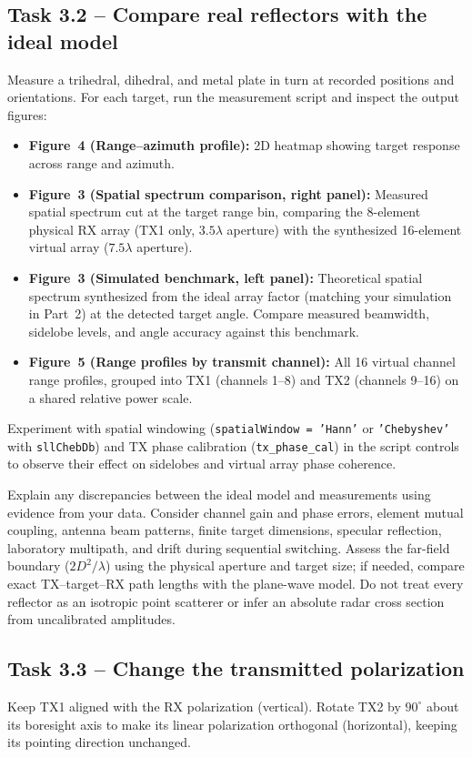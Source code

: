 \documentclass[11pt,a4paper]{article}
\newcommand{\task}[2]{\subsection*{Task #1 -- #2}}
\begin{document}
\task{3.2}{Compare real reflectors with the ideal model}
Measure a trihedral, dihedral, and metal plate in turn at recorded positions and orientations. For each target, run the measurement script and inspect the output figures:
\begin{itemize}
\item \textbf{Figure~4 (Range--azimuth profile):} 2D heatmap showing target response across range and azimuth.
\item \textbf{Figure~3 (Spatial spectrum comparison, right panel):} Measured spatial spectrum cut at the target range bin, comparing the 8-element physical RX array (TX1 only, $3.5\lambda$ aperture) with the synthesized 16-element virtual array ($7.5\lambda$ aperture).
\item \textbf{Figure~3 (Simulated benchmark, left panel):} Theoretical spatial spectrum synthesized from the ideal array factor (matching your simulation in Part~2) at the detected target angle. Compare measured beamwidth, sidelobe levels, and angle accuracy against this benchmark.
\item \textbf{Figure~5 (Range profiles by transmit channel):} All 16 virtual channel range profiles, grouped into TX1 (channels 1--8) and TX2 (channels 9--16) on a shared relative power scale.
\end{itemize}

Experiment with spatial windowing (\texttt{spatialWindow = 'Hann'} or \texttt{'Chebyshev'} with \texttt{sllChebDb}) and TX phase calibration (\texttt{tx\_phase\_cal}) in the script controls to observe their effect on sidelobes and virtual array phase coherence.

Explain any discrepancies between the ideal model and measurements using evidence from your data. Consider channel gain and phase errors, element mutual coupling, antenna beam patterns, finite target dimensions, specular reflection, laboratory multipath, and drift during sequential switching. Assess the far-field boundary ($2D^2/\lambda$) using the physical aperture and target size; if needed, compare exact TX--target--RX path lengths with the plane-wave model. Do not treat every reflector as an isotropic point scatterer or infer an absolute radar cross section from uncalibrated amplitudes.

\task{3.3}{Change the transmitted polarization}
Keep TX1 aligned with the RX polarization (vertical). Rotate TX2 by $90^\circ$ about its boresight axis to make its linear polarization orthogonal (horizontal), keeping its pointing direction unchanged.
\end{document}
